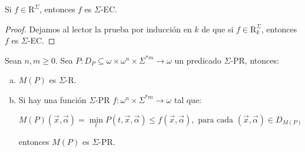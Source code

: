   \begin{theorem}
    \par Si $f \in \mathrm{R}^{\Sigma}$, entonces $f$ es $\Sigma$-EC.
  \end{theorem}
  \begin{proof}
    \par Dejamos al lector la prueba por inducción en $k$ de que si $f\in \mathrm{R}_{k}^{\Sigma}$, entonces $f$ es
    $\Sigma$-EC.
  \end{proof}

  \begin{lemma}
    \par Sean $n, m \geq 0$. Sea $P: D_{P} \subseteq \omega \times \omega^{n} \times \Sigma^{\ast m} \rightarrow \omega$
    un predicado $\Sigma$-PR, ntonces:

    \begin{enumerate}[a)]
      \item $M(P)$ es $\Sigma$-R.
      \item Si hay una función $\Sigma$-PR $f: \omega^{n} \times \Sigma^{\ast m} \rightarrow \omega$ tal que:

        \[
          M(P)(\vec{x},\vec{\alpha}) = \min_{t}P(t,\vec{x},\vec{\alpha}) \leq f(\vec{x},\vec{\alpha}),
          \text{ para cada }(\vec{x},\vec{\alpha}) \in D_{M(P)}
        \]

        \par entonces $M(P)$ es $\Sigma$-PR.
    \end{enumerate}
  \end{lemma}

